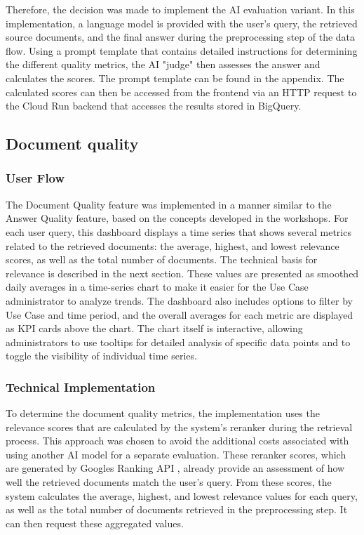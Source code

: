 \documentclass[
	english,
	ruledheaders=section,%
	class=report,%
	thesis={type=bachelor},%
	accentcolor=1b,%
	custommargins=true,%
	marginpar=false,%
	parskip=half-,%
	fontsize=11pt,%
	DIV=14,
]{tudapub}
\begin{document}
Therefore, the decision was made to implement the AI evaluation variant. In this implementation, a language model is provided with the user's query, the retrieved source documents, and the final answer during the preprocessing step of the data flow. Using a prompt template that contains detailed instructions for determining the different quality metrics, the AI "judge" then assesses the answer and calculates the scores. The prompt template can be found in the appendix. The calculated scores can then be accessed from the frontend via an HTTP request to the Cloud Run backend that accesses the results stored in BigQuery.
\subsection{Document quality}
\subsubsection{User Flow}
The Document Quality feature was implemented in a manner similar to the Answer Quality feature, based on the concepts developed in the workshops. For each user query, this dashboard displays a time series that shows several metrics related to the retrieved documents: the average, highest, and lowest relevance scores, as well as the total number of documents. The technical basis for relevance is described in the next section. These values are presented as smoothed daily averages in a time-series chart to make it easier for the Use Case administrator to analyze trends. The dashboard also includes options to filter by Use Case and time period, and the overall averages for each metric are displayed as KPI cards above the chart. The chart itself is interactive, allowing administrators to use tooltips for detailed analysis of specific data points and to toggle the visibility of individual time series.

\subsubsection{Technical Implementation}
To determine the document quality metrics, the implementation uses the relevance scores that are calculated by the system's reranker during the retrieval process. This approach was chosen to avoid the additional costs associated with using another AI model for a separate evaluation. These reranker scores, which are generated by Googles Ranking API \parencite{GoogleReranker}, already provide an assessment of how well the retrieved documents match the user's query. From these scores, the system calculates the average, highest, and lowest relevance values for each query, as well as the total number of documents retrieved in the preprocessing step. It can then request these aggregated values.
\end{document}
